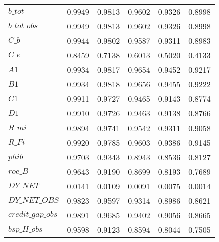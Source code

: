\begin{center}
\begin{longtable}{lccccc}
$b\_tot                     $	 & 	        0.9949	 & 	        0.9813	 & 	        0.9602	 & 	        0.9326	 & 	        0.8998 \\ 
$b\_tot\_obs                $	 & 	        0.9949	 & 	        0.9813	 & 	        0.9602	 & 	        0.9326	 & 	        0.8998 \\ 
$C\_b                       $	 & 	        0.9944	 & 	        0.9802	 & 	        0.9587	 & 	        0.9311	 & 	        0.8983 \\ 
$C\_e                       $	 & 	        0.8459	 & 	        0.7138	 & 	        0.6013	 & 	        0.5020	 & 	        0.4133 \\ 
$A1                         $	 & 	        0.9934	 & 	        0.9817	 & 	        0.9654	 & 	        0.9452	 & 	        0.9217 \\ 
$B1                         $	 & 	        0.9934	 & 	        0.9818	 & 	        0.9656	 & 	        0.9455	 & 	        0.9222 \\ 
$C1                         $	 & 	        0.9911	 & 	        0.9727	 & 	        0.9465	 & 	        0.9143	 & 	        0.8774 \\ 
$D1                         $	 & 	        0.9910	 & 	        0.9726	 & 	        0.9463	 & 	        0.9138	 & 	        0.8766 \\ 
$R\_mi                      $	 & 	        0.9894	 & 	        0.9741	 & 	        0.9542	 & 	        0.9311	 & 	        0.9058 \\ 
$R\_Fi                      $	 & 	        0.9920	 & 	        0.9785	 & 	        0.9603	 & 	        0.9386	 & 	        0.9145 \\ 
$phib                       $	 & 	        0.9703	 & 	        0.9343	 & 	        0.8943	 & 	        0.8536	 & 	        0.8127 \\ 
$roe\_B                     $	 & 	        0.9643	 & 	        0.9190	 & 	        0.8699	 & 	        0.8193	 & 	        0.7689 \\ 
$DY\_NET                    $	 & 	        0.0141	 & 	        0.0109	 & 	        0.0091	 & 	        0.0075	 & 	        0.0014 \\ 
$DY\_NET\_OBS               $	 & 	        0.9823	 & 	        0.9597	 & 	        0.9314	 & 	        0.8986	 & 	        0.8621 \\ 
$credit\_gap\_obs           $	 & 	        0.9891	 & 	        0.9685	 & 	        0.9402	 & 	        0.9056	 & 	        0.8665 \\ 
$bsp\_H\_obs                $	 & 	        0.9598	 & 	        0.9123	 & 	        0.8594	 & 	        0.8044	 & 	        0.7505 \\ 

\end{longtable}
\end{center}
